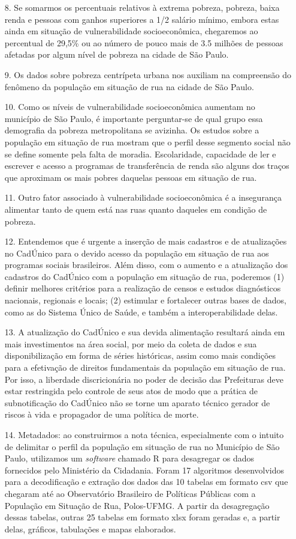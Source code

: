 \documentclass[14pt]{extarticle}
\begin{document}
\begin{enumerate}
  \item[8.] Se somarmos os percentuais relativos à extrema pobreza, pobreza, baixa renda e pessoas com ganhos superiores a 1/2 salário mínimo, embora estas ainda em situação de vulnerabilidade socioeconômica, chegaremos ao percentual de 29,5\% ou ao número de pouco mais de 3.5 milhões de pessoas afetadas por algum nível de pobreza na cidade de São Paulo. 
  \item[9.] Os dados sobre pobreza centrípeta urbana nos auxiliam na compreensão do fenômeno da população em situação de rua na cidade de São Paulo.
  \item[10.] Como os níveis de vulnerabilidade socioeconômica aumentam no município de São Paulo, é importante perguntar-se de qual grupo essa demografia da pobreza metropolitana se avizinha. Os estudos sobre a população em situação de rua mostram que o perfil desse segmento social não se define somente pela falta de moradia. Escolaridade, capacidade de ler e escrever e acesso a programas de transferência de renda são alguns dos traços que aproximam os mais pobres daquelas pessoas em situação de rua. 
  \item[11.] Outro fator associado à vulnerabilidade socioeconômica é a insegurança alimentar tanto de quem está nas ruas quanto daqueles em condição de pobreza.
  \item[12.] Entendemos que é urgente a inserção de mais cadastros e de atualizações no CadÚnico para o devido acesso da população em situação de rua aos programas sociais brasileiros. Além disso, com o aumento e a atualização dos cadastros do CadÚnico com a população em situação de rua, poderemos (1) definir melhores critérios para a realização de censos e estudos diagnósticos nacionais, regionais e locais; (2) estimular e fortalecer outras bases de dados, como as do Sistema Único de Saúde, e também a interoperabilidade delas. 
  \item[13.]  A atualização do CadÚnico e sua devida alimentação resultará ainda em mais investimentos na área social, por meio da coleta de dados e sua disponibilização em forma de séries históricas, assim como mais condições para a efetivação de direitos fundamentais da população em situação de rua. Por isso, a liberdade discricionária no poder de decisão das Prefeituras deve estar restringida pelo controle de seus atos de modo que a prática de subnotificação do CadÚnico não se torne um aparato técnico gerador de riscos à vida e propagador de uma política de morte. 
    \item[14.] Metadados: ao construirmos a nota técnica, especialmente com o intuito de delimitar o perfil da população em situação de rua no Município de São Paulo, utilizamos um \emph{software} chamado R para desagregar os dados fornecidos pelo Ministério da Cidadania. Foram 17 algoritmos desenvolvidos para a decodificação e extração dos dados das 10 tabelas em formato csv que chegaram até ao Observatório Brasileiro de Políticas Públicas com a População em Situação de Rua, Polos-UFMG. A partir da desagregação dessas tabelas, outras 25 tabelas em formato xlsx foram geradas e, a partir delas, gráficos, tabulações e mapas elaborados. 

\end{enumerate}
\end{document}
